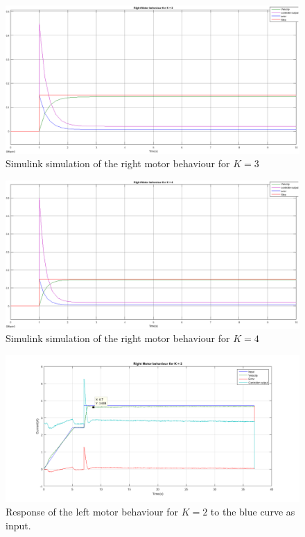 \begin{figure}[htbp]
\centering
\includegraphics[width = \textwidth]{pics/RM_K3_SIM.png}
\caption{Simulink simulation of the right motor behaviour for $K = 3$}
\label{fig:RM_K3_SIM}
\end{figure}

\begin{figure}[htbp]
\centering
\includegraphics[width = \textwidth]{pics/RM_K4_SIM.png}
\caption{Simulink simulation of the right motor behaviour for $K = 4$}
\label{fig:RM_K4_SIM}
\end{figure}

\begin{figure}[htbp]
\centering
\includegraphics[width = \textwidth]{pics/RM_K2.png}
\caption{Response of the left motor behaviour for $K = 2$ to the blue curve as input.}
\label{fig:RM_K2}
\end{figure}


